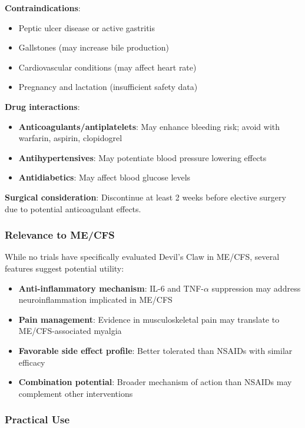 \begin{warning}
\textbf{Contraindications}:
\begin{itemize}
    \item Peptic ulcer disease or active gastritis
    \item Gallstones (may increase bile production)
    \item Cardiovascular conditions (may affect heart rate)
    \item Pregnancy and lactation (insufficient safety data)
\end{itemize}
\textbf{Drug interactions}:
\begin{itemize}
    \item \textbf{Anticoagulants/antiplatelets}: May enhance bleeding risk; avoid with warfarin, aspirin, clopidogrel
    \item \textbf{Antihypertensives}: May potentiate blood pressure lowering effects
    \item \textbf{Antidiabetics}: May affect blood glucose levels
\end{itemize}
\textbf{Surgical consideration}: Discontinue at least 2 weeks before elective surgery due to potential anticoagulant effects.
\end{warning}

\subsubsection{Relevance to ME/CFS}

While no trials have specifically evaluated Devil's Claw in ME/CFS, several features suggest potential utility:
\begin{itemize}
    \item \textbf{Anti-inflammatory mechanism}: IL-6 and TNF-$\alpha$ suppression may address neuroinflammation implicated in ME/CFS
    \item \textbf{Pain management}: Evidence in musculoskeletal pain may translate to ME/CFS-associated myalgia
    \item \textbf{Favorable side effect profile}: Better tolerated than NSAIDs with similar efficacy
    \item \textbf{Combination potential}: Broader mechanism of action than NSAIDs may complement other interventions
\end{itemize}

\subsubsection{Practical Use}

